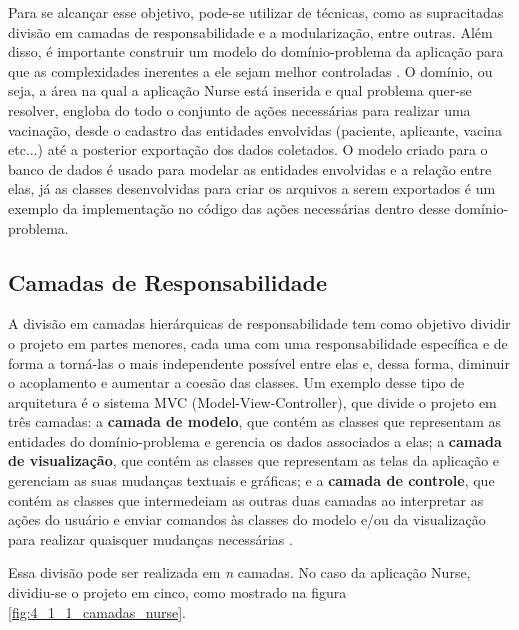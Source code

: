 Para se alcançar esse objetivo, pode-se utilizar de técnicas, como as supracitadas divisão em camadas de responsabilidade e a modularização, entre outras. Além disso, é importante construir um modelo do domínio-problema da aplicação para que as complexidades inerentes a ele sejam melhor controladas \cite{evans2017domain}. O domínio, ou seja, a área na qual a aplicação Nurse está inserida e qual problema quer-se resolver, engloba do todo o conjunto de ações necessárias para realizar uma vacinação, desde o cadastro das entidades envolvidas (paciente, aplicante, vacina etc...) até a posterior exportação dos dados coletados. O modelo criado para o banco de dados é usado para modelar as entidades envolvidas e a relação entre elas, já as classes desenvolvidas para criar os arquivos a serem exportados é um exemplo da implementação no código das ações necessárias dentro desse domínio-problema.

\subsection{Camadas de Responsabilidade}
\label{cap4:SubSec:CamadasResponsabilidade}
A divisão em camadas hierárquicas de responsabilidade tem como objetivo dividir o projeto em partes menores, cada uma com uma responsabilidade específica e de forma a torná-las o mais independente possível entre elas \cite{Faust2020} e, dessa forma, diminuir o acoplamento e aumentar a coesão das classes. Um exemplo desse tipo de arquitetura é o sistema MVC (Model-View-Controller), que divide o projeto em três camadas: a \textbf{camada de modelo}, que contém as classes que representam as entidades do domínio-problema e gerencia os dados associados a elas; a \textbf{camada de visualização}, que contém as classes que representam as telas da aplicação e gerenciam as suas mudanças textuais e gráficas; e a \textbf{camada de controle}, que contém as classes que intermedeiam as outras duas camadas ao interpretar as ações do usuário e enviar comandos às classes do modelo e/ou da visualização para realizar quaisquer mudanças necessárias \cite{burbeck1987mvc}.

Essa divisão pode ser realizada em \textit{n} camadas. No caso da aplicação Nurse, dividiu-se o projeto em cinco, como mostrado na figura \ref{fig:4_1_1_camadas_nurse}.

